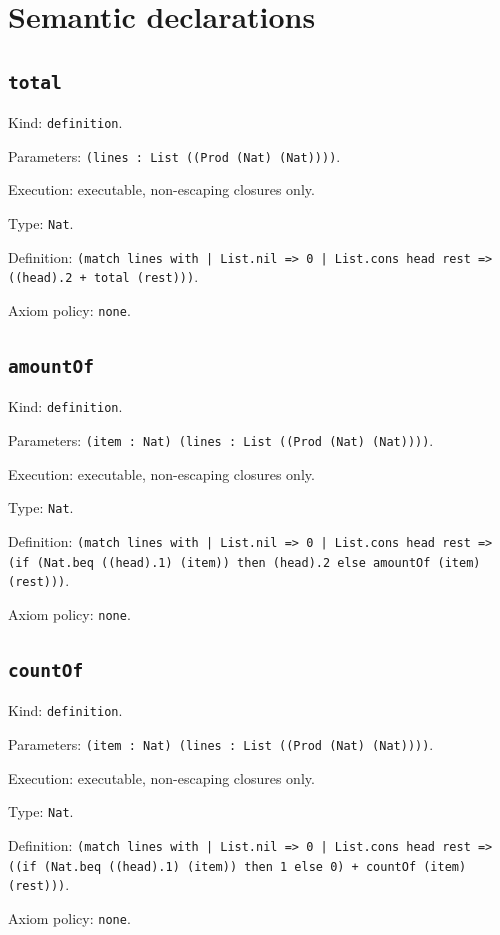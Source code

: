 \documentclass[11pt]{article}
\begin{document}
\section*{Semantic declarations}
\subsection*{\texttt{total}}
\noindent Kind: \texttt{definition}.\par
\noindent Parameters: \texttt{(lines : List ((Prod (Nat) (Nat))))}.\par
\noindent Execution: executable, non-escaping closures only.\par
\noindent Type: \texttt{Nat}.\par
\noindent Definition: \texttt{(match lines with | List.nil => 0 | List.cons head rest => ((head).2 + total (rest)))}.\par
\noindent Axiom policy: \texttt{none}.\par
\subsection*{\texttt{amountOf}}
\noindent Kind: \texttt{definition}.\par
\noindent Parameters: \texttt{(item : Nat) (lines : List ((Prod (Nat) (Nat))))}.\par
\noindent Execution: executable, non-escaping closures only.\par
\noindent Type: \texttt{Nat}.\par
\noindent Definition: \texttt{(match lines with | List.nil => 0 | List.cons head rest => (if (Nat.beq ((head).1) (item)) then (head).2 else amountOf (item) (rest)))}.\par
\noindent Axiom policy: \texttt{none}.\par
\subsection*{\texttt{countOf}}
\noindent Kind: \texttt{definition}.\par
\noindent Parameters: \texttt{(item : Nat) (lines : List ((Prod (Nat) (Nat))))}.\par
\noindent Execution: executable, non-escaping closures only.\par
\noindent Type: \texttt{Nat}.\par
\noindent Definition: \texttt{(match lines with | List.nil => 0 | List.cons head rest => ((if (Nat.beq ((head).1) (item)) then 1 else 0) + countOf (item) (rest)))}.\par
\noindent Axiom policy: \texttt{none}.\par
\end{document}
